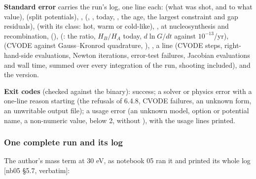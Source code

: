 \textbf{Standard error} carries the run's log, one line each:  (what was shot, and to what value),  (split potentials), ,  (, ,  today, , the age, the largest constraint and gap residuals),  (with its class: hot, warm or cold-like), ,  at nucleosynthesis and recombination,  (),  (: the  ratio, $H_B/H_A$ today, $d \ln G/dt$ against $10^{-13}$/yr),  (CVODE against Gauss--Kronrod quadrature, ), , a  line (CVODE steps, right-hand-side evaluations, Newton iterations, error-test failures, Jacobian evaluations and wall time, summed over every integration of the run, shooting included), and the version.

\textbf{Exit codes} (checked against the binary):  success;  a solver or physics error with a one-line reason starting  (the refusals of 6.4.8, CVODE failures, an unknown  form, an unwritable output file);  a usage error (an unknown model, option or potential name, a non-numeric value,  below 2,  without ), with the usage lines printed.

\subsubsection{One complete run and its log}
\label{sec:6.4.6}

The author's mass term at 30 eV, as notebook 05 ran it and printed its whole log [nb05 \S{}5.7, verbatim]:

